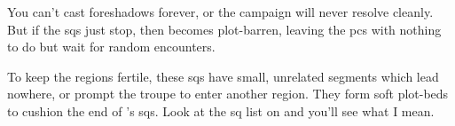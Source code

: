 
You can't cast foreshadows forever, or the \gls{campaign} will never resolve cleanly.
But if the \glspl{sq} just stop, then  becomes plot-barren, leaving the \glspl{pc} with nothing to do but wait for random encounters.

To keep the \glspl{region} fertile, these \glspl{sq} have small, unrelated \glspl{segment} which lead nowhere, or prompt the troupe to enter another \gls{region}.
They form soft plot-beds to cushion the end of 's \glspl{sq}.
Look at the \gls{sq} list on  and you'll see what I mean.
